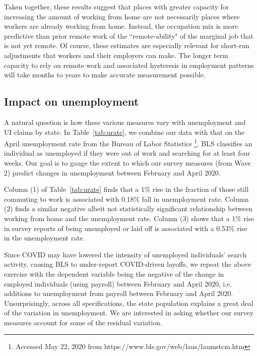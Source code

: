 \documentclass[12pt]{article}
\begin{document}


Taken together, these results suggest that places with greater capacity for increasing the amount of working from home are not necessarily places where workers are already working from home.  Instead, the occupation mix is more predictive than prior remote work of the ``remote-ability" of the marginal job that is not yet remote. Of course, these estimates are especially relevant for short-run adjustments that workers and their employers can make. The longer term capacity to rely on remote work and associated hysteresis in employment patterns will take months to years to make accurate measurement possible.

\subsection{Impact on unemployment} \label{sec:UI}

A natural question is how these various measures vary with unemployment and UI claims by state. In Table~\ref{tab:urate}, we combine our data with that on the April unemployment rate from the Bureau of Labor Statistics \footnote{Accessed May 22, 2020 from https://www.bls.gov/web/laus/laumstcm.htm}. BLS classifies an individual as unemployed if they were out of work and searching for at least four weeks. Our goal is to gauge the extent to which our survey measures (from Wave 2) predict changes in unemployment between February and April 2020. 

Column (1) of Table~\ref{tab:urate} finds that a 1\%  rise in the fraction of those still commuting to work is associated with 0.18\% fall in unemployment rate. Column (2) finds a similar negative albeit not statistically significant relationship between working from home and the unemployment rate. Column (3) shows that a 1\% rise in survey reports of being unemployed or laid off is associated with a 0.53\% rise in the unemployment rate.  



Since COVID may have lowered the intensity of unemployed individuals' search activity, causing BLS to under-report COVID-driven layoffs, we repeat the above exercise with the dependent variable being the negative of the change in employed individuals (using payroll) between February and April 2020, i.e. additions to unemployment from payroll between February and April 2020. Unsurprisingly, across all specifications, the state population explains a great deal of the variation in unemployment. We are interested in asking whether our survey measures account for some of the residual variation. 
\end{document}
